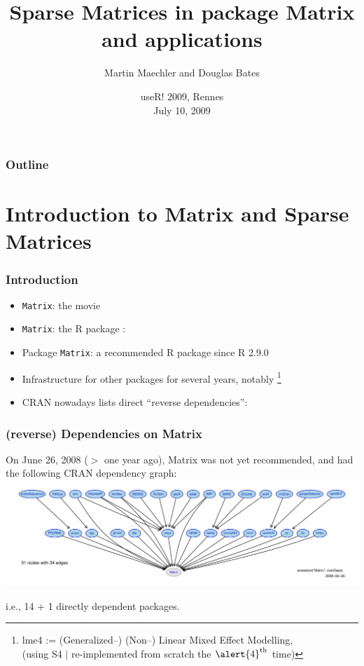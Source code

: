 \documentclass[dvipsnames,pdflatex,beamer]{beamer}
\title[Sparse Matrices in \texttt{Matrix} pkg]{%
Sparse Matrices in package Matrix and applications
}
\author[Martin Maechler, Doug Bates]{Martin Maechler and Douglas Bates}
\institute[R Core]{%
  Seminar für Statistik \\ ETH Zurich  \ \ Switzerland

  \bigskip

  Department of Statistics \\ University of Madison, Wisconsin \ \ U.S.A.

  {\color{Scode}\texttt{(maechler|bates)@R-project.org} \ \ (R-Core)}
}
\date[useR!, Rennes 2009]{useR! 2009, Rennes \\ July 10, 2009}
\begin{document}
\begin{frame} \titlepage
\end{frame}
%
\begin{frame} \frametitle{Outline}
  \tableofcontents
\end{frame}

\section[Intro]{Introduction to Matrix and Sparse Matrices}\label{sec:intro}
\begin{frame}\frametitle{Introduction}
  \begin{itemize}
  \item<1-2> \texttt{Matrix}: \pause the movie
  \item<3-> \texttt{Matrix}: the R package :

    \bigskip

  \item<4-> Package \texttt{Matrix}: a \alert{recommended} R package since R 2.9.0
  \item<4-> Infrastructure for other packages for several years,
    notably \footnote{
      \alert{lme4} := (Generalized--) (Non--) \alert{L}inear \alert{M}ixed
      \alert{E}ffect Modelling,
      \\ \qquad\qquad
      (using S\alert{4} $\mid$ re-implemented from scratch the
       $\alert{4}^\mathrm{th}$ time)}

  \item<4-> CRAN nowadays lists direct ``reverse dependencies'':
  \end{itemize}
\end{frame}

\begin{frame}\frametitle{(reverse) Dependencies on Matrix}
  On June 26, 2008 ($>$ one year ago), Matrix was not yet recommended,
  and had the following CRAN dependency graph:
\hspace*{-6mm}
  \includegraphics[width=1.1\textwidth]{figs/deps-on-Matrix2008-06}

  i.e., 14 + 1 directly dependent packages.
\end{frame}
\end{document}
